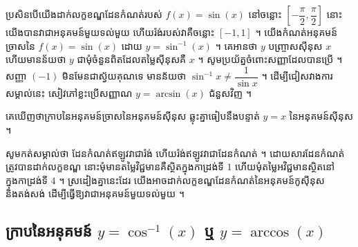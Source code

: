 ប្រសិនបើយើងដាក់លក្ខខណ្ឌដែនកំណត់របស់ $f(x) = \sin(x)$ នៅចន្លោះ $\left[-\dfrac{\pi}{2}, \dfrac{\pi}{2}\right]$ នោះយើងបានវាជាអនុគមន៍មួយទល់មួយ ហើយរ៉ង់របស់វាគឺចន្លោះ $[-1, 1]$ ។ យើងកំណត់អនុគមន៍ច្រាសនៃ $f(x) = \sin(x)$ ដោយ $y = \sin^{-1}(x)$ ។ គេអានថា $y$ បញ្ច្រាសស៊ីនុស $x$ ហើយមានន័យថា $y$ ជាមុំចំនួនពិតដែលតម្លៃស៊ីនុសគឺ $x$ ។ សូមប្រយ័ត្នចំពោះសញ្ញាដែលបានប្រើ ។ សញ្ញា $(-1)$ មិនមែនជាស្វ័យគុណទេ មានន័យថា $\sin^{-1}x \ne \dfrac{1}{\sin x}$ ។ ដើម្បីជៀសវាងការសម្គាល់នេះ សៀវភៅខ្លះប្រើសញ្ញាណ $y = \arcsin(x)$ ជំនួសវិញ ។

គេឃើញថាក្រាបនៃអនុគមន៍ច្រាសនៃអនុគមន៍ស៊ីនុស ឆ្លុះគ្នាធៀបនឹងបន្ទាត់ $y = x$ នៃអនុគមន៍ស៊ីនុស ។

សូមកត់សម្គាល់ថា ដែនកំណត់ឥឡូវវាជារ៉ង់ ហើយរ៉ង់ឥឡូវវាជាដែនកំណត់ ។ ដោយសារដែនកំណត់ត្រូវបានដាក់លក្ខខណ្ឌ នោះមុំមានតម្លៃវិជ្ជមានគឺស្ថិតក្នុងកាដ្រង់ទី $1$ ហើយមុំតម្លៃអវិជ្ជមានស្ថិតនៅក្នុងកាដ្រង់ទី $4$ ។ ស្រដៀងគ្នានេះដែរ យើងអាចដាក់លក្ខខណ្ឌដែនកំណត់នៃអនុគមន៍កូស៊ីនុស និងតង់សង់ ដើម្បីធ្វើឱ្យវាជាអនុគមន៍មួយទល់មួយ ។

\subsection{ក្រាបនៃអនុគមន៍ \texorpdfstring{$y = \cos^{-1}(x)$}{y = arccos x} ឬ \texorpdfstring{$y = \arccos(x)$}{y = arccos x}}

